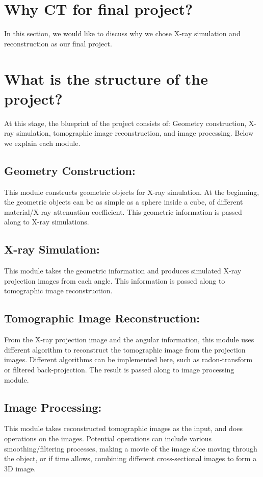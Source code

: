 \documentclass[11]{article}
\begin{document}
\section{Why CT for final project?}
In this section, we would like to discuss why we chose X-ray simulation and reconstruction as our final project.

\section{What is the structure of the project?}
At this stage, the blueprint of the project consists of: Geometry construction, X-ray simulation, tomographic image reconstruction, and image processing. Below we explain each module.

	\subsection{Geometry Construction:}
		This module constructs geometric objects for X-ray simulation. At the beginning, the geometric objects can be as simple as a sphere inside a cube, of different material/X-ray attenuation coefficient. This geometric information is passed along to X-ray simulations.

	\subsection{X-ray Simulation:}
		This module takes the geometric information and produces simulated X-ray projection images from each angle. This information is passed along to tomographic image reconstruction.

	\subsection{Tomographic Image Reconstruction:}
		From the X-ray projection image and the angular information, this module uses different algorithm to reconstruct the tomographic image from the projection images. Different algorithms can be implemented here, such as radon-transform or filtered back-projection. The result is passed along to image processing module.

	\subsection{Image Processing:}
		This module takes reconstructed tomographic images as the input, and does operations on the images. Potential operations can include various smoothing/filtering processes, making a movie of the image slice moving through the object, or if time allows, combining different cross-sectional images to form a 3D image. 
	
\end{document}
